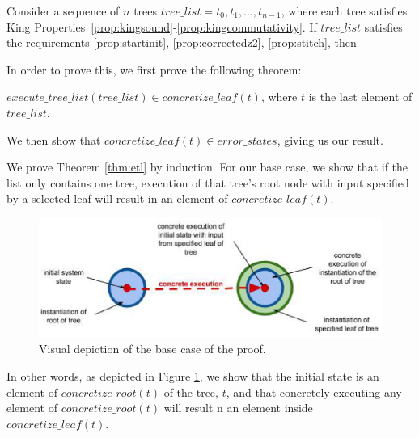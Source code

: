 \begin{theorem}
\label{thm:sufficiency} Consider a sequence of $n$ trees $\mathit{tree\_list} =
t_0, t_1, \ldots, t_{n-1}$, where each tree satisfies King
Properties~\ref{prop:kingsound}-\ref{prop:kingcommutativity}. If
$\mathit{tree\_list}$ satisfies the requirements \ref{prop:startinit},
\ref{prop:correctedz2}, \ref{prop:stitch}, then 
\end{theorem}
 
 In order to prove this, we first prove the following theorem:

\begin{theorem}
\label{thm:etl}
 $execute\_tree\_list (tree\_list) \in concretize\_leaf (t)$, where $t$ is the last element of $tree\_list$.
\end{theorem}

We then show that $concretize\_leaf (t) \in error\_states$, giving us our result.

We prove Theorem \ref{thm:etl} by induction. 
For our base case, we show that if the list only contains one tree, execution of that tree's root node with input specified by a selected leaf will result in an element of $concretize\_leaf (t)$.

\begin{figure}
\centering
\includegraphics[width=.8\textwidth]{set3.eps}
\caption{Visual depiction of the base case of the proof.}
\label{fig:basecase}
\end{figure}

In other words, as depicted in Figure \ref{fig:basecase}, we show that the initial state is an element of $concretize\_root(t)$ of the tree, $t$, and that concretely executing any element of $concretize\_root(t)$ will result n an element inside $concretize\_leaf(t).$



